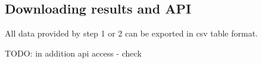 \subsection{Downloading results and API}


All data provided by step 1 or 2 can be exported in csv table format. 

TODO: in addition api access - check